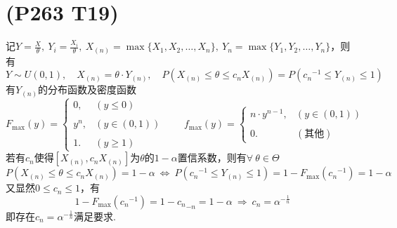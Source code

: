 \documentclass{article}
\begin{document}
\section{(P263 T19)}  %
记$Y = \displaystyle{\frac{X}{\theta}},\ Y_{i} = \displaystyle{\frac{X_i}{\theta}},\ X_{(n)} = \max\{X_1, X_2, \ldots, X_n \},\ Y_{n} = \max\{Y_1, Y_2, \ldots, Y_n\}$，则有
\[
    Y \sim U(0,1),\quad
    X_{(n)} = \theta\cdot Y_{(n)},\quad
    P\left(X_{(n)} \leq \theta \leq c_n X_{(n)}\right)
    = P\left({c_n}^{-1} \leq Y_{(n)} \leq 1\right)
\]
有$Y_{(n)}$的分布函数及密度函数
\[
    F_{\max} (y) = 
    \begin{cases}
        0 , & (y \leq 0)\\
        \\
        y^n , & (y\in (0, 1))\\
        \\
        1 . & (y\geq 1)
    \end{cases} 
    \qquad
    f_{\max} (y) = 
    \begin{cases}
        n\cdot y^{n-1} , & (y\in (0 , 1))\\
        \\
        0. & (\mbox{其他})
    \end{cases}    
\]
若有$c_n$使得$\left[X_{(n)} , c_n X_{(n)} \right]$为$\theta$的$1-\alpha$置信系数，则有$\forall\ \theta \in \Theta$
\[
    P\left(X_{(n)} \leq \theta \leq c_n X_{(n)}\right) = 1 - \alpha
    \ \Leftrightarrow\ 
    P\left({c_n}^{-1} \leq Y_{(n)} \leq 1\right) = 1 - F_{\max} ({c_n}^{-1}) = 1 - \alpha
\]
又显然$0\leq c_n \leq 1$，有
\[
    1 - F_{\max} ({c_n}^{-1})
    = 1 - {c_n}_{-n}
    = 1 - \alpha    
    \ \Rightarrow\ 
    c_n = \alpha^{-\frac{1}{n}}
\]
即存在$c_n = \alpha^{-\frac{1}{n}}$满足要求.
\end{document}
